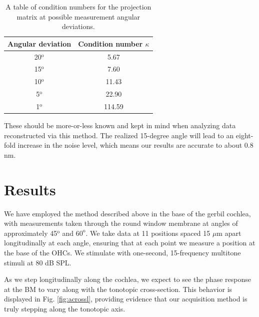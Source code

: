 \documentclass[aip,cp,amsmath,amssymb,reprint]{revtex4-2}
\begin{document}
\begin{table} 
\begin{center}
    \begin{tabular}{|c|c|}
        \hline
        Angular deviation & Condition number $\kappa$ \\
        \hline
        20$^\text{o}$ & 5.67\\
        15$^\text{o}$ & 7.60\\
        10$^\text{o}$ & 11.43\\
        5$^\text{o}$ & 22.90 \\
        1$^\text{o}$ & 114.59\\
        \hline
    \end{tabular}
    \caption{A table of condition numbers for the projection matrix at possible measurement angular deviations.}
\label{kappas}
\end{center}
\end{table}
 
\par{These should be more-or-less known and kept in mind when analyzing data reconstructed via this method. The realized 15-degree angle will lead to an eight-fold increase in the noise level, which means our results are accurate to about 0.8 nm.}


\section{\label{sec:results}Results}

\par{We have employed the method described above in the base of the gerbil cochlea, with measurements taken through the round window membrane at angles of approximately 45$^\text{o}$ and $60^\text{o}$. We take data at 11 positions spaced 15 $\mu$m apart longitudinally at each angle, ensuring that at each point we measure a position at the base of the OHCs. We stimulate with one-second, 15-frequency multitone stimuli at 80 dB SPL.}
\par{As we step longitudinally along the cochlea, we expect to see the phase response at the BM to vary along with the tonotopic cross-section. This behavior is displayed in Fig. \ref{fig:acrossl}, providing evidence that our acquisition method is truly stepping along the tonotopic axis.}
\end{document}
